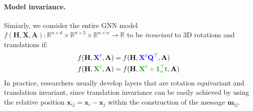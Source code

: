\paragraph{Model invariance.}
Simiarly, we consider the entire GNN model $f(\mathbf{H}, \mathbf{X}, \mathbf{A}):\mathbb{R}^{n\times d}\times\mathbb{R}^{n\times 3}\times \mathbb{R}^{n \times n} \rightarrow \mathbb{R}$ to be \textit{invariant} to 3D rotations and translations if:
\begin{align}
    f(\mathbf{H}, {\color{blue}\mathbf{X}^{\ell}}, \mathbf{A}) &= f(\mathbf{H}, {\color{blue}\mathbf{X}^{\ell}\mathbf{Q}^{\top}}, \mathbf{A}) \\
    f(\mathbf{H},  {\color{green!60!black}\mathbf{X}^{\ell}}, \mathbf{A}) &= f(\mathbf{H}, {\color{green!60!black}\mathbf{X}^{\ell}+ \mathbf{1}_n^{\top}\mathbf{t}}, \mathbf{A})
\end{align}
In practice, researchers usually develop layers that are rotation equivariant and translation invariant, since translation invariance can be easily achieved by using the relative position $\mathbf{x}_{ij} = \mathbf{x}_i - \mathbf{x}_j$ within the construction of the message $\mathbf{m}_{ij}$.
